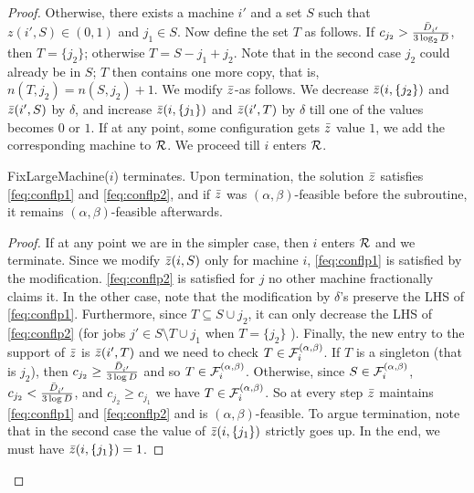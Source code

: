 \begin{proof}
Otherwise, there exists a machine $i'$
and a set $S$ such that $z(i',S) \in (0,1)$ and $j_1 \in S$.
Now define the set $T$ as follows. If $c_{j_2} > \frac{\bar{D}_{i'}}{3\log_2 D}$, then $T = \{j_2\}$; otherwise $T = S - j_1 + j_2$.
Note that in the second case $j_2$ could already be in $S$; $T$ then contains one more copy, that is, $n(T,j_2) = n(S,j_2) + 1$.
We modify $\bar z$-as follows. We decrease $\bar z(i,\{j_2\})$ and $\bar z(i',S)$ by $\delta$, and increase $\bar z(i,\{j_1\})$ and $\bar z(i',T)$ by $\delta$ till one of the values becomes $0$ or $1$.
If at any point, some configuration gets $\bar z$ value $1$, we add the corresponding machine to ${\cal R}$.
We proceed till $i$ enters ${\cal R}$.

\begin{claim}\label{fclm:002}
	{\sf FixLargeMachine}($i$) terminates. Upon termination, the solution $\bar z$ satisfies \eqref{feq:conflp1} and \eqref{feq:conflp2}, and
	if $\bar z$ was $(\alpha,\beta)$-feasible before the subroutine, it remains $(\alpha,\beta)$-feasible afterwards.
\end{claim}
\begin{proof}
	If at any point we are in the simpler case, then $i$ enters ${\cal R}$ and we terminate. Since we modify $\bar z(i,S)$ only for machine $i$, \eqref{feq:conflp1} is satisfied by the modification.
	\eqref{feq:conflp2} is satisfied for $j$ no other machine fractionally claims it. In the other case, note that the modification by $\delta$'s preserve the LHS of \eqref{feq:conflp1}. Furthermore, since $T\subseteq S\cup j_2$, it can only
	decrease the LHS of \eqref{feq:conflp2} (for jobs $j' \in S\setminus T\cup j_1$ when $T=\{j_2\}$ ). Finally, the new entry to the support of $\bar z$ is $\bar z(i',T)$ and we need to check $T\in {\cal F}^{(\alpha,\beta)}_i$.
	If $T$ is a singleton (that is $j_2$), then $c_{j_2} \geq \frac{\bar{D}_{i'}}{3\log D}$ and so $T\in {\cal F}^{(\alpha,\beta)}_i$.
  Otherwise, since $S\in {\cal F}^{(\alpha,\beta)}_i$, $c_{j_2} <  \frac{\bar{D}_{i'}}{3\log D}$, and $c_{j_2} \geq c_{j_1}$ we have $T\in {\cal F}^{(\alpha,\beta)}_i$.
  So at every step $\bar z$ maintains \eqref{feq:conflp1} and \eqref{feq:conflp2} and is $(\alpha,\beta)$-feasible. To argue termination, note that in the second case the value of $\bar z(i,\{j_1\})$ strictly goes up.
  In the end, we must have $\bar z(i,\{j_1\}) = 1$.
\end{proof}


\end{proof}
